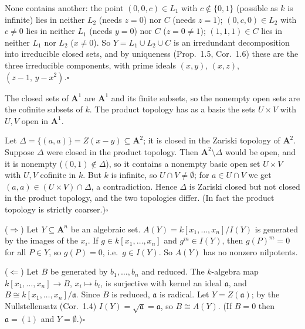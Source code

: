\documentclass[11pt]{article}
\begin{document}
None contains another: the point $(0,0,c)\in L_1$ with $c\notin\{0,1\}$ (possible as $k$ is infinite) lies in neither $L_2$ (needs $z=0$) nor $C$ (needs $z=1$); $(0,c,0)\in L_2$ with $c\ne0$ lies in neither $L_1$ (needs $y=0$) nor $C$ ($z=0\ne1$); $(1,1,1)\in C$ lies in neither $L_1$ nor $L_2$ ($x\ne0$). So $Y=L_1\cup L_2\cup C$ is an irredundant decomposition into irreducible closed sets, and by uniqueness (Prop.~1.5, Cor.~1.6) these are the three irreducible components, with prime ideals $(x,y)$, $(x,z)$, $(z-1,\,y-x^2)$.\hfill$\square$

\pf
The closed sets of $\mathbf A^1$ are $\mathbf A^1$ and its finite subsets, so the nonempty open sets are the cofinite subsets of $k$. The product topology has as a basis the sets $U\times V$ with $U,V$ open in $\mathbf A^1$.

Let $\Delta=\{(a,a)\}=Z(x-y)\subseteq\mathbf A^2$; it is closed in the Zariski topology of $\mathbf A^2$. Suppose $\Delta$ were closed in the product topology. Then $\mathbf A^2\setminus\Delta$ would be open, and it is nonempty ($(0,1)\notin\Delta$), so it contains a nonempty basic open set $U\times V$ with $U,V$ cofinite in $k$. But $k$ is infinite, so $U\cap V\ne\emptyset$; for $a\in U\cap V$ we get $(a,a)\in(U\times V)\cap\Delta$, a contradiction. Hence $\Delta$ is Zariski closed but not closed in the product topology, and the two topologies differ. (In fact the product topology is strictly coarser.)\hfill$\square$

\pf
($\Rightarrow$) Let $Y\subseteq\mathbf A^n$ be an algebraic set. $A(Y)=k[x_1,\dots,x_n]/I(Y)$ is generated by the images of the $x_i$. If $g\in k[x_1,\dots,x_n]$ and $g^m\in I(Y)$, then $g(P)^m=0$ for all $P\in Y$, so $g(P)=0$, i.e.\ $g\in I(Y)$. So $A(Y)$ has no nonzero nilpotents.

($\Leftarrow$) Let $B$ be generated by $b_1,\dots,b_n$ and reduced. The $k$-algebra map $k[x_1,\dots,x_n]\to B$, $x_i\mapsto b_i$, is surjective with kernel an ideal $\mathfrak a$, and $B\cong k[x_1,\dots,x_n]/\mathfrak a$. Since $B$ is reduced, $\mathfrak a$ is radical. Let $Y=Z(\mathfrak a)$; by the Nullstellensatz (Cor.~1.4) $I(Y)=\sqrt{\mathfrak a}=\mathfrak a$, so $B\cong A(Y)$. (If $B=0$ then $\mathfrak a=(1)$ and $Y=\emptyset$.)\hfill$\square$
\end{document}
